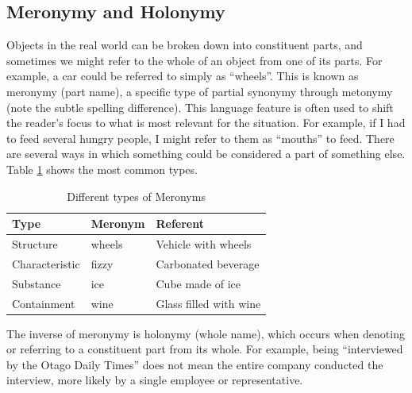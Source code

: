 \subsection{Meronymy and Holonymy}

Objects in the real world can be broken down into constituent parts, and sometimes we might refer to the whole of an object from one of its parts. For example, a car could be referred to simply as ``wheels''. This is known as meronymy (part name), a specific type of partial synonymy through metonymy (note the subtle spelling difference). This language feature is often used to shift the reader's focus to what is most relevant for the situation. For example, if I had to feed several hungry people, I might refer to them as ``mouths'' to feed. There are several ways in which something could be considered a part of something else. Table \ref{meronymyholonymy} shows the most common types.


\begin{table}[h]
\centering
\begin{tabular}{|l|l|l|}
\hline
\textbf{Type}  & \textbf{Meronym}   & \textbf{Referent}    \\ \hline
Structure      & wheels  & Vehicle with wheels \\
Characteristic & fizzy   & Carbonated beverage \\
Substance      & ice     & Cube made of ice   \\
Containment    & wine    & Glass filled with wine \\ \hline
\end{tabular}
\caption{Different types of Meronyms}
\label{meronymyholonymy}
\end{table}



The inverse of meronymy is holonymy (whole name), which occurs when denoting or referring to a constituent part from its whole. For example, being ``interviewed by the Otago Daily Times'' does not mean the entire company conducted the interview, more likely by a single employee or representative. 



